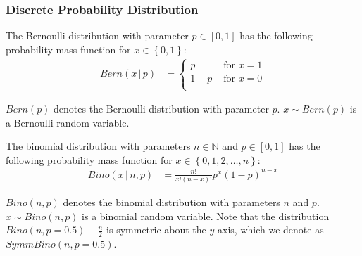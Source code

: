 \subsubsection{Discrete Probability Distribution}
\label{subsubsec:DiscreteProbabilityDistribution}

\begin{definition}
    \label{def:BernoulliDistribution}
    The Bernoulli distribution with parameter $p \in \left[0,1\right] $ has the following probability mass function for $x\in \left\{0,1\right\}  $:
    \begin{equation}
        \begin{split}
            Bern\left(x \,|\,p \right)&=
            \begin{cases}
                p   & \text{ for } x =1 \\
                1-p & \text{ for } x =0 \\
            \end{cases}
        \end{split}
    \end{equation}
\end{definition}
$Bern\left(p \right)$ denotes the Bernoulli distribution with parameter $p  $.
$x \sim Bern\left( p \right)$ is a Bernoulli random variable.


\begin{definition}
    \label{def:BinomialDistribution}
    The binomial distribution with parameters $n \in \mathbb{N} $ and $p \in \left[0,1\right] $ has the following probability mass function for $x \in \left\{0,1,2, \ldots ,n\right\} $:
    \begin{equation}
        \begin{split}
            Bino\left( x \,|\,n,p \right)&=\frac{n!}{x!\left(n-x\right)! }p^x\left(1-p\right) ^{n-x}
        \end{split}
    \end{equation}
\end{definition}
$Bino\left(n,p \right)$ denotes the binomial distribution with parameters $n  $ and $p  $.
$x \sim Bino\left( n,p \right)$ is a binomial random variable. Note that the distribution $Bino\left(n,p=0.5 \right)-\frac{n}{2}$ is symmetric about the $y$-axis, which we denote as $SymmBino\left(n,p=0.5 \right)$.


